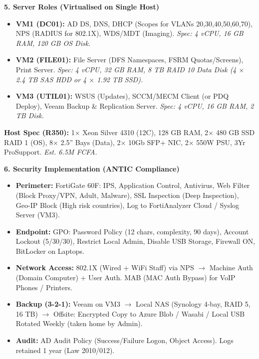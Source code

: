 \documentclass[11pt]{article}
\begin{document}
\begin{exoresolu}
\noindent\textbf{5. Server Roles (Virtualised on Single Host)}
\begin{itemize}
    \item \textbf{VM1 (DC01):} AD DS, DNS, DHCP (Scopes for VLANs 20,30,40,50,60,70), NPS (RADIUS for 802.1X), WDS/MDT (Imaging). \textit{Spec: 4 vCPU, 16 GB RAM, 120 GB OS Disk.}
    \item \textbf{VM2 (FILE01):} File Server (DFS Namespaces, FSRM Quotas/Screens), Print Server. \textit{Spec: 4 vCPU, 32 GB RAM, 8 TB RAID 10 Data Disk (4 $\times$ 2.4 TB SAS HDD or 4 $\times$ 1.92 TB SSD).}
    \item \textbf{VM3 (UTIL01):} WSUS (Updates), SCCM/MECM Client (or PDQ Deploy), Veeam Backup \& Replication Server. \textit{Spec: 4 vCPU, 16 GB RAM, 2 TB Disk.}
\end{itemize}
\textbf{Host Spec (R350):} 1$\times$ Xeon Silver 4310 (12C), 128 GB RAM, 2$\times$ 480 GB SSD RAID 1 (OS), 8$\times$ 2.5'' Bays (Data), 2$\times$ 10Gb SFP+ NIC, 2$\times$ 550W PSU, 3Yr ProSupport. \textit{Est. 6.5M FCFA.}

\noindent\textbf{6. Security Implementation (ANTIC Compliance)}
\begin{itemize}
    \item \textbf{Perimeter:} FortiGate 60F: IPS, Application Control, Antivirus, Web Filter (Block Proxy/VPN, Adult, Malware), SSL Inspection (Deep Inspection), Geo-IP Block (High risk countries), Log to FortiAnalyzer Cloud / Syslog Server (VM3).
    \item \textbf{Endpoint:} GPO: Password Policy (12 chars, complexity, 90 days), Account Lockout (5/30/30), Restrict Local Admin, Disable USB Storage, Firewall ON, BitLocker on Laptops.
    \item \textbf{Network Access:} 802.1X (Wired + WiFi Staff) via NPS $\rightarrow$ Machine Auth (Domain Computer) + User Auth. MAB (MAC Auth Bypass) for VoIP Phones / Printers.
    \item \textbf{Backup (3-2-1):} Veeam on VM3 $\rightarrow$ Local NAS (Synology 4-bay, RAID 5, 16 TB) $\rightarrow$ Offsite: Encrypted Copy to Azure Blob / Wasabi / Local USB Rotated Weekly (taken home by Admin).
    \item \textbf{Audit:} AD Audit Policy (Success/Failure Logon, Object Access). Logs retained 1 year (Law 2010/012).
\end{itemize}


\end{exoresolu}
\end{document}
